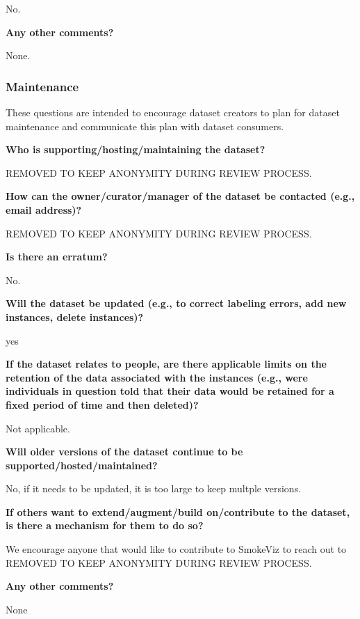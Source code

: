 \documentclass{article}
\begin{document}
No.

\textbf{Any other comments?}

None.

\subsubsection{Maintenance}

These questions are intended to encourage dataset creators to plan for dataset maintenance
and communicate this plan with dataset consumers.

\textbf{Who is supporting/hosting/maintaining the dataset?}

REMOVED TO KEEP ANONYMITY DURING REVIEW PROCESS.

\textbf{How can the owner/curator/manager of the dataset be contacted (e.g., email address)?}

REMOVED TO KEEP ANONYMITY DURING REVIEW PROCESS.

\textbf{Is there an erratum?}

No.

\textbf{Will the dataset be updated (e.g., to correct labeling errors, add new instances, delete instances)?}

yes

\textbf{If the dataset relates to people, are there applicable limits on the retention of the data associated with the instances (e.g., were individuals in question told that their data would be retained for a fixed period of time and then deleted)?}

Not applicable.

\textbf{Will older versions of the dataset continue to be supported/hosted/maintained?}

No, if it needs to be updated, it is too large to keep multple versions.

\textbf{If others want to extend/augment/build on/contribute to the dataset, is there a mechanism for them to do so?}

We encourage anyone that would like to contribute to SmokeViz to reach out to REMOVED TO KEEP ANONYMITY DURING REVIEW PROCESS.

\textbf{Any other comments?}

None
\end{document}
